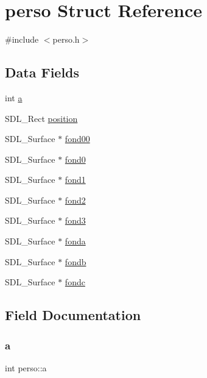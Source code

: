 \hypertarget{structperso}{}\section{perso Struct Reference}
\label{structperso}


{\ttfamily \#include $<$perso.\+h$>$}

\subsection*{Data Fields}
\begin{DoxyCompactItemize}
\item 
int \hyperlink{structperso_afd06df60ee01ab1d69546cca298386d2}{a}
\item 
S\+D\+L\+\_\+\+Rect \hyperlink{structperso_a74aed265eb926987cf218b19d163c746}{position}
\item 
S\+D\+L\+\_\+\+Surface $\ast$ \hyperlink{structperso_abc00c1912b93daeeb58e8e2c1d84fb09}{fond00}
\item 
S\+D\+L\+\_\+\+Surface $\ast$ \hyperlink{structperso_a08c74faf3f88be57cf3a74045d4516b4}{fond0}
\item 
S\+D\+L\+\_\+\+Surface $\ast$ \hyperlink{structperso_ad396706f66a5d6c81b71a27b2eec9e02}{fond1}
\item 
S\+D\+L\+\_\+\+Surface $\ast$ \hyperlink{structperso_ac0a45d49ba5381c604c01a39596e55f7}{fond2}
\item 
S\+D\+L\+\_\+\+Surface $\ast$ \hyperlink{structperso_a6445f715e75440295b6acb1e6975fcb9}{fond3}
\item 
S\+D\+L\+\_\+\+Surface $\ast$ \hyperlink{structperso_aad23cb6acdce0282ea32c0ed5d807809}{fonda}
\item 
S\+D\+L\+\_\+\+Surface $\ast$ \hyperlink{structperso_a436b5abedfc6ba00785a3cf4ff6bc32c}{fondb}
\item 
S\+D\+L\+\_\+\+Surface $\ast$ \hyperlink{structperso_ac022be57eda44dffb7cd61238105d829}{fondc}
\end{DoxyCompactItemize}


\subsection{Field Documentation}
\mbox{\label{structperso_afd06df60ee01ab1d69546cca298386d2}} 
\subsubsection{\texorpdfstring{a}{a}}
{\footnotesize\ttfamily int perso\+::a}

